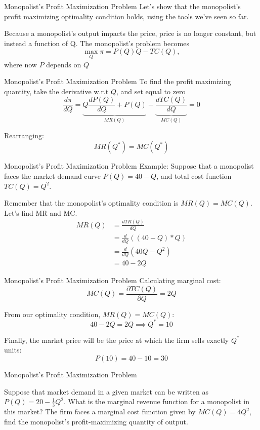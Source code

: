 \documentclass{beamer}
\begin{document}
\begin{frame}{Monopolist's Profit Maximization Problem}
  Let's show that the monopolist's profit maximizing optimality condition holds, using the tools we've seen so far.

  \bigskip
  Because a monopolist's output impacts the price, price is no longer constant, but instead a function of Q. The monopolist's problem becomes
  $$
    \max_Q \pi= P(Q) Q - TC(Q),
  $$
  where now $P$ depends on $Q$
\end{frame}

\begin{frame}{Monopolist's Profit Maximization Problem}
  To find the profit maximizing quantity, take the derivative w.r.t $Q$, and set equal to zero
  $$
    \frac{d\pi}{dQ} = \underbrace{Q \frac{dP(Q)}{dQ} + P(Q)}_{MR(Q)} - \underbrace{\frac{dTC(Q)}{dQ}}_{MC(Q)} = 0
  $$

  \bigskip
  Rearranging:
  $$
    MR(Q^*)=MC(Q^*)
  $$
\end{frame}

\begin{frame}{Monopolist's Profit Maximization Problem}
  Example: Suppose that a monopolist faces the market demand curve $P(Q) = 40 - Q$, and total cost function $TC(Q) = Q^2$.

  \bigskip
  Remember that the monopolist's optimality condition is $MR(Q) = MC(Q)$. Let's find MR and MC.
  \begin{align*}
    MR(Q) &= \frac{dTR(Q)}{dQ}      \\
          &= \frac{d}{dQ}((40 - Q) * Q) \\
          &= \frac{d}{dQ}(40Q - Q^2)  \\
          &= 40 - 2Q
  \end{align*}
\end{frame}

\begin{frame}{Monopolist's Profit Maximization Problem}
  Calculating marginal cost:
  $$
    MC(Q) = \frac{\partial TC(Q)}{\partial Q} = 2Q
  $$ 

  \bigskip
  From our optimality condition, $MR(Q) = MC(Q)$:
  $$
    40 - 2Q = 2Q \implies Q^* = 10
  $$

  \bigskip
  Finally, the market price will be the price at which the firm sells exactly $Q^*$ units:
  $$
    P(10) = 40-10=30
  $$
\end{frame}

\begin{frame}{Monopolist's Profit Maximization Problem}


  Suppose that market demand in a given market can be written as $P(Q) = 20 - \frac{1}{3} Q^2$. What is the marginal revenue function for a monopolist in this market?
  The firm faces a marginal cost function given by $MC(Q) = 4Q^2$, find the monopolist's profit-maximizing quantity of output.
\end{frame}
\end{document}
